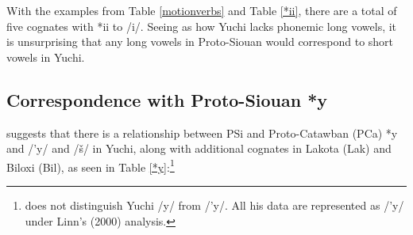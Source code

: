 \documentclass[output=paper]{LSP/langsci}
\begin{document}
With the examples from Table \ref{motionverbs} and Table \ref{*ii}, there are a total of five cognates with *ii to /i/. Seeing as how Yuchi lacks phonemic long vowels, it is unsurprising that any long vowels in Proto-Siouan would correspond to short vowels in Yuchi.  

\subsection{Correspondence with Proto-Siouan *y}

\citet{Carter1980} suggests that there is a relationship between PSi and Proto-Catawban (PCa) *y and /'y/ and /\v{s}/ in Yuchi, along with additional cognates in Lakota (Lak) and Biloxi (Bil), as seen in Table \ref{*y}:\footnote{\citet{Carter1980} does not distinguish Yuchi /y/ from /'y/. All his data are represented as /'y/ under Linn's (2000) analysis.}

\begin{table}
\caption{Correspondences between PSi *y and Yuchi /'y/ and /\v{s}/}\label{*y}
\end{table}
\end{document}
